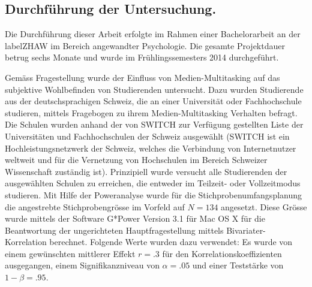 \subsection{Durchführung der Untersuchung.}
Die Durchführung dieser Arbeit erfolgte im Rahmen einer Bachelorarbeit an der \gls{labelZHAW} im Bereich angewandter Psychologie. Die gesamte Projektdauer betrug sechs Monate und wurde im Frühlingssemesters 2014 durchgeführt.

\label{section.auswahlVersuchsp}
Gemäss Fragestellung wurde der Einfluss von Medien-Multitasking auf das subjektive Wohlbefinden von Studierenden untersucht. Dazu wurden Studierende aus der deutschsprachigen Schweiz, die an einer Universität oder Fachhochschule studieren, mittels Fragebogen zu ihrem Medien-Multitasking Verhalten befragt. Die Schulen wurden anhand der von SWITCH \cite{Switch2014} zur Verfügung gestellten Liste der Universitäten und Fachhochschulen der Schweiz ausgewählt (SWITCH ist ein Hochleistungsnetzwerk der Schweiz, welches die Verbindung von Internetnutzer weltweit und für die Vernetzung von Hochschulen im Bereich Schweizer Wissenschaft zuständig ist). Prinzipiell wurde versucht alle Studierenden der ausgewählten Schulen zu erreichen, die entweder im Teilzeit- oder Vollzeitmodus studieren. Mit Hilfe der Poweranalyse \cite{Faul2009} wurde für die Stichprobenumfangsplanung die angestrebte  Stichprobengrösse im Vorfeld auf $N = 134$ angesetzt. Diese Grösse wurde mittels der Software G*Power Version 3.1 für Mac OS X für die Beantwortung der ungerichteten Hauptfragestellung mittels Bivariater-Korrelation berechnet. Folgende Werte wurden dazu verwendet: Es wurde von einem gewünschten mittlerer Effekt $r = .3$  \cite{Cohen1988} für den Korrelationskoeffizienten ausgegangen, einem Signifikanzniveau von $\alpha=.05$ und einer Teststärke von $1-\beta=.95$.

